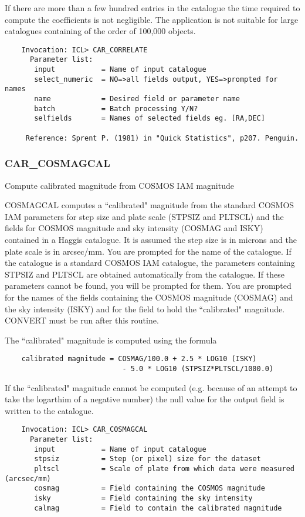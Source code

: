 If there are more than a few hundred entries in the catalogue the
time required to compute the coefficients is not negligible.
The application is not suitable for large catalogues containing
of the order of 100,000 objects.
 
\begin{verbatim}
    Invocation: ICL> CAR_CORRELATE
      Parameter list:
       input           = Name of input catalogue
       select_numeric  = NO=>all fields output, YES=>prompted for names
       name            = Desired field or parameter name
       batch           = Batch processing Y/N?
       selfields       = Names of selected fields eg. [RA,DEC]

     Reference: Sprent P. (1981) in "Quick Statistics", p207. Penguin.
\end{verbatim}

\subsubsection{CAR\_COSMAGCAL}
 
Compute calibrated magnitude from COSMOS IAM magnitude

COSMAGCAL computes a ``calibrated" magnitude from the standard
COSMOS IAM parameters for step size and plate scale (STPSIZ and
PLTSCL) and the fields for COSMOS magnitude and sky intensity
(COSMAG and ISKY) contained in a Haggis catalogue. 
It is assumed the step size is in microns and the plate scale is 
in arcsec/mm.
You are prompted for the name of the catalogue. 
If the catalogue is a standard COSMOS IAM catalogue, the parameters
containing STPSIZ and PLTSCL are obtained automatically from
the catalogue. 
If these parameters cannot be found, you will be prompted for them. 
You are prompted for the names of the fields containing 
the COSMOS magnitude (COSMAG) and the sky intensity (ISKY) and 
for the field to hold the ``calibrated" magnitude.
CONVERT must be run after this routine.

The ``calibrated" magnitude is computed using the formula
\begin{verbatim}
    calibrated magnitude = COSMAG/100.0 + 2.5 * LOG10 (ISKY)
                            - 5.0 * LOG10 (STPSIZ*PLTSCL/1000.0)
\end{verbatim}
If the ``calibrated" magnitude cannot be computed (e.g. because
of an attempt to take the logarthim of a negative number) the
null value for the output field is written to the catalogue.
\begin{verbatim}
    Invocation: ICL> CAR_COSMAGCAL
      Parameter list:
       input           = Name of input catalogue
       stpsiz          = Step (or pixel) size for the dataset
       pltscl          = Scale of plate from which data were measured (arcsec/mm)
       cosmag          = Field containing the COSMOS magnitude
       isky            = Field containing the sky intensity
       calmag          = Field to contain the calibrated magnitude
\end{verbatim}


